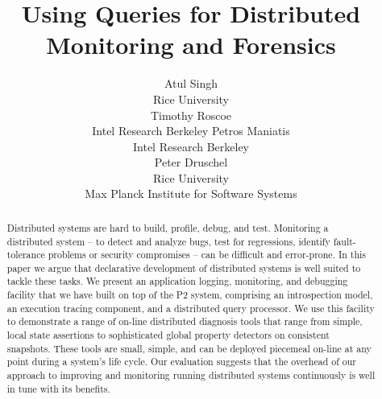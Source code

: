 \documentclass{sig-alt-full}
\begin{document}
\title{Using Queries for Distributed Monitoring and Forensics}

\author{
\alignauthor Atul Singh\\
{\affaddr Rice University}\\
\vspace{24pt}
Timothy Roscoe\\
{\affaddr Intel Research Berkeley}
\alignauthor Petros Maniatis\\
{\affaddr Intel Research Berkeley}\\
\vspace{24pt}
Peter Druschel\\
{\affaddr Rice University}\\
{\affaddr Max Planck Institute for Software Systems}
}


\date{}
\maketitle

\thispagestyle{plain}

\begin{abstract}


Distributed systems are hard to build, profile,
debug, and test.  Monitoring a distributed system --
to detect and analyze bugs, test for regressions,
identify fault-tolerance problems or security compromises -- can be
difficult and error-prone.  
In this paper we argue that declarative 
development of distributed systems
is well suited to tackle these tasks.  We present
an application logging, monitoring, and debugging
facility that we have built on top of the P2 system,
comprising an introspection model, an execution tracing component,
and a distributed query processor.  We use this facility to
demonstrate a range of on-line distributed
diagnosis tools that range from simple, local state
assertions to sophisticated global property detectors
on consistent snapshots.  These tools are small, simple, and can be
deployed piecemeal on-line at any point during a system's life cycle. 
Our evaluation suggests that the overhead of our approach to improving and
monitoring running distributed systems continuously is well
in tune with its benefits. 

\end{abstract}
\end{document}
